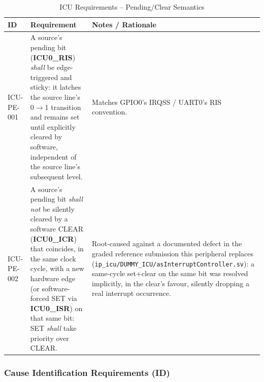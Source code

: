 \begin{table}[H]
\caption{ICU Requirements -- Pending/Clear Semantics}
\label{tab:asIcuReqPE}
\centering
\begin{tabularx}{\textwidth}{|l |X |X|}
  \hline
  ID & Requirement & Notes / Rationale \\
  \hline
  \hline
  ICU-PE-001 &
    A source's pending bit (\textbf{ICU0\_RIS}) \textit{shall} be
    edge-triggered and sticky: it latches the source line's 0$\to$1
    transition and remains set until explicitly cleared by software,
    independent of the source line's subsequent level. &
    Matches GPIO0's IRQSS / UART0's RIS convention. \\
  \hline
  ICU-PE-002 &
    A source's pending bit \textit{shall not} be silently cleared by a
    software CLEAR (\textbf{ICU0\_ICR}) that coincides, in the same clock
    cycle, with a new hardware edge (or software-forced SET via
    \textbf{ICU0\_ISR}) on that same bit: SET \textit{shall} take priority
    over CLEAR. &
    Root-caused against a documented defect in the graded reference
    submission this peripheral replaces
    (\texttt{ip\_icu/DUMMY\_ICU/asInterruptController.sv}): a same-cycle
    set+clear on the same bit was resolved implicitly, in the clear's
    favour, silently dropping a real interrupt occurrence. \\
  \hline
\end{tabularx}
\end{table}

\subsubsection{Cause Identification Requirements (ID)}

